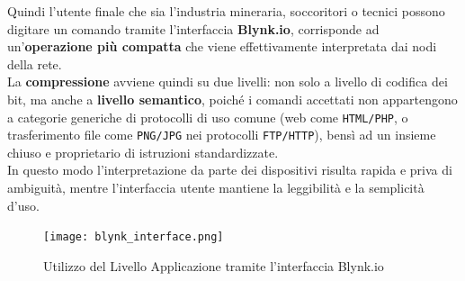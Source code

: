 Quindi l'utente finale che sia l'industria mineraria, soccoritori o tecnici possono 
digitare un comando tramite l'interfaccia \textbf{Blynk.io}, 
corrisponde ad un'\textbf{operazione più compatta} che viene effettivamente interpretata dai nodi della rete. \\
La \textbf{compressione} avviene quindi su due livelli: non solo a livello di codifica dei bit, ma anche a \textbf{livello semantico}, 
poiché i comandi accettati non appartengono a categorie generiche di protocolli di uso comune 
(web come \texttt{HTML/PHP}, o trasferimento file come \texttt{PNG/JPG} nei protocolli \texttt{FTP/HTTP}), 
bensì ad un insieme chiuso e proprietario di istruzioni standardizzate. \\
In questo modo l’interpretazione da parte dei dispositivi risulta rapida e priva di ambiguità, 
mentre l’interfaccia utente mantiene la leggibilità e la semplicità d’uso.

\begin{figure}[H]
    \centering
    \texttt{[image: blynk\_interface.png]}
    \caption{Utilizzo del Livello Applicazione tramite l'interfaccia Blynk.io}
    \label{fig:blynk_interface}
\end{figure}



